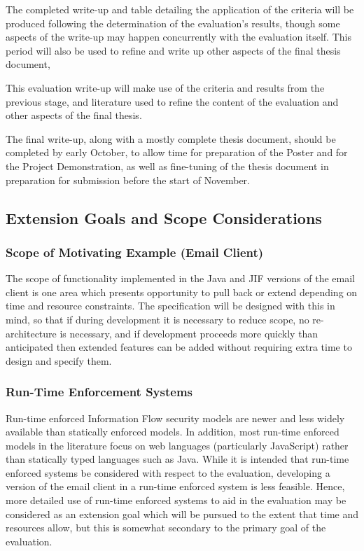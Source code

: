 The completed write-up and table detailing the application of the criteria will be produced following the determination of the evaluation's results, though some aspects of the write-up may happen concurrently with the evaluation itself. This period will also be used to refine and write up other aspects of the final thesis document,

This evaluation write-up will make use of the criteria and results from the previous stage, and literature used to refine the content of the evaluation and other aspects of the final thesis.

The final write-up, along with a mostly complete thesis document, should be completed by early October, to allow time for preparation of the Poster and for the Project Demonstration, as well as fine-tuning of the thesis document in preparation for submission before the start of November.

\pagebreak

\subsection{Extension Goals and Scope Considerations}
	
	\subsubsection{Scope of Motivating Example (Email Client)}
	
	The scope of functionality implemented in the Java and JIF versions of the email client is one area which presents opportunity to pull back or extend depending on time and resource constraints. The specification will be designed with this in mind, so that if during development it is necessary to reduce scope, no re-architecture is necessary, and if development proceeds more quickly than anticipated then extended features can be added without requiring extra time to design and specify them.
	
	\subsubsection{Run-Time Enforcement Systems}
	
	Run-time enforced Information Flow security models are newer and less widely available than statically enforced models. In addition, most run-time enforced models in the literature focus on web languages (particularly JavaScript) rather than statically typed languages such as Java. While it is intended that run-time enforced systems be considered with respect to the evaluation, developing a version of the email client in a run-time enforced system is less feasible. Hence, more detailed use of run-time enforced systems to aid in the evaluation may be considered as an extension goal which will be pursued to the extent that time and resources allow, but this is somewhat secondary to the primary goal of the evaluation.
	
